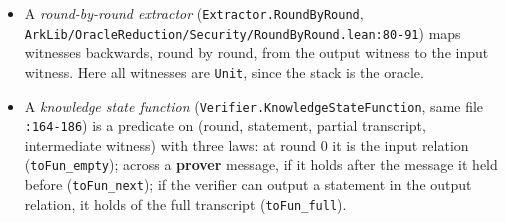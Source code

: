 \begin{itemize}
\item A \emph{round-by-round extractor} (\texttt{Extractor.\allowbreak{}RoundByRound}, \texttt{A\allowbreak{}r\allowbreak{}k\allowbreak{}L\allowbreak{}i\allowbreak{}b\allowbreak{}/\allowbreak{}O\allowbreak{}r\allowbreak{}a\allowbreak{}c\allowbreak{}l\allowbreak{}e\allowbreak{}R\allowbreak{}e\allowbreak{}d\allowbreak{}u\allowbreak{}c\allowbreak{}t\allowbreak{}i\allowbreak{}o\allowbreak{}n\allowbreak{}/\allowbreak{}S\allowbreak{}e\allowbreak{}c\allowbreak{}u\allowbreak{}r\allowbreak{}i\allowbreak{}t\allowbreak{}y\allowbreak{}/\allowbreak{}R\allowbreak{}o\allowbreak{}u\allowbreak{}n\allowbreak{}d\allowbreak{}B\allowbreak{}y\allowbreak{}R\allowbreak{}o\allowbreak{}u\allowbreak{}n\allowbreak{}d\allowbreak{}.\allowbreak{}l\allowbreak{}e\allowbreak{}a\allowbreak{}n\allowbreak{}:\allowbreak{}8\allowbreak{}0\allowbreak{}-{}\allowbreak{}9\allowbreak{}1}) maps witnesses backwards, round by round, from the output witness to the input witness. Here all witnesses are \texttt{Unit}, since the stack is the oracle.
\item A \emph{knowledge state function} (\texttt{V\allowbreak{}e\allowbreak{}r\allowbreak{}i\allowbreak{}f\allowbreak{}i\allowbreak{}e\allowbreak{}r\allowbreak{}.\allowbreak{}K\allowbreak{}n\allowbreak{}o\allowbreak{}w\allowbreak{}l\allowbreak{}e\allowbreak{}d\allowbreak{}g\allowbreak{}e\allowbreak{}S\allowbreak{}t\allowbreak{}a\allowbreak{}t\allowbreak{}e\allowbreak{}F\allowbreak{}u\allowbreak{}n\allowbreak{}c\allowbreak{}t\allowbreak{}i\allowbreak{}o\allowbreak{}n}, same file \texttt{:164-{}186}) is a predicate on (round, statement, partial transcript, intermediate witness) with three laws: at round 0 it is the input relation (\texttt{toFun\_\allowbreak{}empty}); across a \textbf{prover} message, if it holds after the message it held before (\texttt{toFun\_\allowbreak{}next}); if the verifier can output a statement in the output relation, it holds of the full transcript (\texttt{toFun\_\allowbreak{}full}).

\end{itemize}
